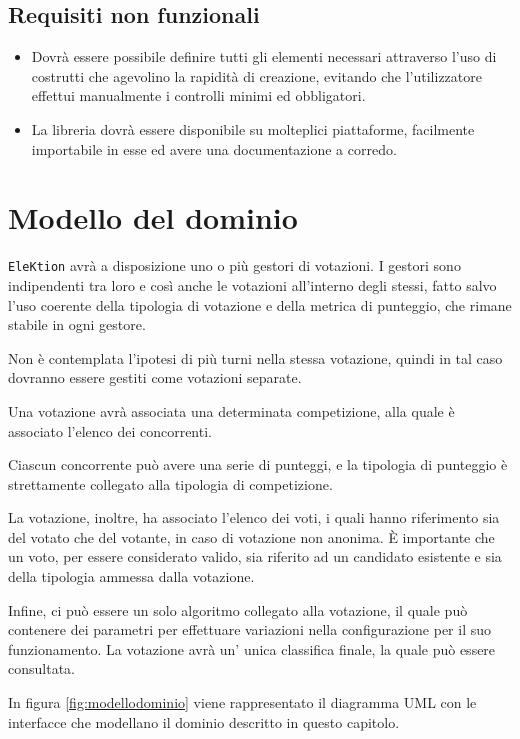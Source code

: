 \documentclass[12pt,a4paper,openright,twoside]{book}
\begin{document}
    \subsection{Requisiti non funzionali}
    \begin{itemize}
        \item{Dovrà essere possibile definire tutti gli elementi necessari attraverso l'uso di costrutti che agevolino la rapidità di creazione,
        evitando che l'utilizzatore effettui manualmente i controlli minimi ed obbligatori.}
    \item{La libreria dovrà essere disponibile su molteplici piattaforme, facilmente importabile in esse ed avere una documentazione
    a corredo.}
    \end{itemize}


\section{Modello del dominio}
\label{modellodominio}
\texttt{EleKtion} avrà a disposizione uno o più gestori di votazioni. 
I gestori sono indipendenti tra loro e così anche le votazioni all'interno degli stessi,
fatto salvo l'uso coerente della tipologia di votazione e della metrica di punteggio,
che rimane stabile in ogni gestore.

Non è contemplata l'ipotesi di più turni nella stessa votazione, 
quindi in tal caso dovranno essere gestiti come votazioni separate.

Una votazione avrà associata una determinata competizione, 
alla quale è associato l'elenco dei concorrenti. 

Ciascun concorrente può avere una serie di punteggi,
 e la tipologia di punteggio è strettamente collegato alla tipologia di competizione.

La votazione, inoltre, ha associato l'elenco dei voti,
i quali hanno riferimento sia del votato che del votante,
in caso di votazione non anonima.
È importante che un voto, per essere considerato valido, 
sia riferito ad un candidato esistente e sia della tipologia ammessa dalla votazione.

Infine, ci può essere un solo algoritmo collegato alla votazione,
il quale può contenere dei parametri per effettuare variazioni nella configurazione per il suo funzionamento.
La votazione avrà un' unica classifica finale, la quale può essere consultata.

In figura \ref{fig:modellodominio} viene rappresentato il diagramma UML con le interfacce che modellano
il dominio descritto in questo capitolo.
\newpage
\end{document}
